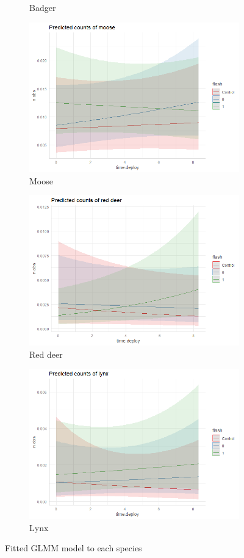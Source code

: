 \begin{figure}
\begin{subfigure}{.5\textwidth}
		  \caption{Badger}
		  	\label{fig:glmm_grvl}
	\end{subfigure}
		\begin{subfigure}{.5\textwidth}
		  \centering
		  	\includegraphics[width=.8\linewidth]{../R/glmm_sp_files/figure-gfm/elg-report-1.png}
		  \caption{Moose}
		  	\label{fig:glmm_elg}
	\end{subfigure}
		\begin{subfigure}{.5\textwidth}
		  \centering
		  	\includegraphics[width=.8\linewidth]{../R/glmm_sp_files/figure-gfm/hjort-report-1.png}
		  \caption{Red deer}
		  	\label{fig:glmm_hjort}
	\end{subfigure}
		\begin{subfigure}{.5\textwidth}
		  \centering
		  	\includegraphics[width=.8\linewidth]{../R/glmm_sp_files/figure-gfm/gaupe-report-1.png}
		  \caption{Lynx}
		  	\label{fig:glmm_gaup}
	\end{subfigure}
		\caption{Fitted GLMM model to each species}
	\label{fig:glmm_sp}
\end{figure}



